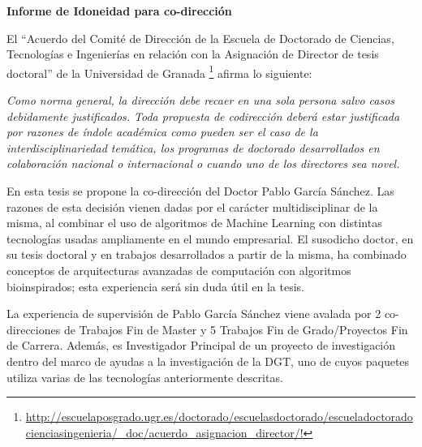 {\bf Informe de Idoneidad para co-dirección} %

El ``Acuerdo del Comité de Dirección de la Escuela de Doctorado de Ciencias, Tecnologías e Ingenierías en relación con la Asignación de Director de tesis doctoral'' de la Universidad de Granada \footnote{\url{http://escuelaposgrado.ugr.es/doctorado/escuelasdoctorado/escueladoctoradocienciasingenieria/_doc/acuerdo_asignacion_director/!}} afirma lo siguiente:

{\em Como norma general, la dirección debe recaer en una sola persona salvo casos
debidamente justificados. Toda propuesta de codirección deberá estar justificada por
razones de índole académica como pueden ser el caso de la interdisciplinariedad
temática, los programas de doctorado desarrollados en colaboración nacional o
internacional o cuando uno de los directores sea novel.}

En esta tesis se propone la co-dirección del Doctor Pablo García
Sánchez. Las razones de esta decisión vienen dadas por el carácter
multidisciplinar de la misma, al combinar el uso de algoritmos de
Machine Learning con distintas tecnologías usadas ampliamente en el
mundo empresarial. El susodicho doctor, en su tesis doctoral y en
trabajos desarrollados a partir de la misma, ha combinado conceptos de
arquitecturas avanzadas de computación con algoritmos bioinspirados;
esta experiencia será sin duda útil en la tesis.

La experiencia de supervisión de Pablo García Sánchez viene avalada
por 2 co-direcciones de Trabajos Fin de Master y 5 Trabajos Fin de
Grado/Proyectos Fin de Carrera. Además, es Investigador Principal de
un proyecto de investigación dentro del marco de ayudas a la
investigación de la DGT, %
 uno de cuyos paquetes utiliza varias de las
tecnologías anteriormente descritas. 

